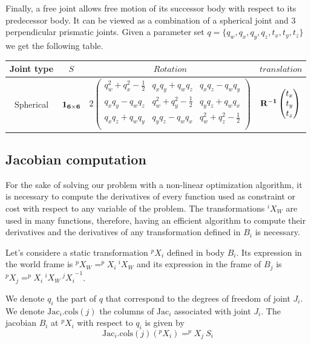 Finally, a free joint allows free motion of its successor body with respect to its predecessor body.
It can be viewed as a combination of a spherical joint and 3 perpendicular prismatic joints.
Given a parameter set $q = \{ q_w, q_x, q_y, q_z, t_x, t_y, t_z\}$ we get the following table.

\begin{tabular}{|c|c|c|c|}
  \hline
  Joint type & $S$ & $Rotation$ & $translation$ \\
  \hline
  Spherical
  &
  $\bf{1}_{6\times 6}$
  &
  $2 \begin{pmatrix}
    q_w^2 +q_x^2-\frac{1}{2} & q_x q_y + q_w q_z & q_x q_z - q_w q_y \\
    q_x q_y - q_w q_z & q_w^2 +q_y^2-\frac{1}{2} & q_y q_z + q_w q_x \\
    q_x q_z + q_w q_y & q_y q_z - q_w q_x & q_w^2 +q_z^2-\frac{1}{2} \\
  \end{pmatrix}$
  &
  $\bf{R}^{-1}\begin{pmatrix}
    t_x \\ t_y \\ t_z
  \end{pmatrix}$
  \\
  \hline
\end{tabular}

\subsection{Jacobian computation}
\label{sub:jacobian_computation}

For the sake of solving our problem with a non-linear optimization algorithm, it is necessary to compute the derivatives of every function used as constraint or cost with respect to any variable of the problem.
The transformations $^iX_W$ are used in many functions, therefore, having an efficient algorithm to compute their derivatives and the derivatives of any transformation defined in $B_i$ is necessary.

Let's considere a static transformation $^pX_i$ defined in body $B_i$.
Its expression in the world frame is $^pX_W = ^pX_i\ ^iX_W$ and its expression in the frame of $B_j$ is $^pX_j = ^pX_i\ ^iX_W\ {^jX_i}^{-1}$.

We denote $q_i$ the part of $q$ that correspond to the degrees of freedom of joint $J_i$.
We denote $\text{Jac}_i.\text{cols}(j)$ the columns of $\text{Jac}_i$ associated with joint $J_i$.
The jacobian $B_i$ at $^pX_i$ with respect to $q_i$ is given by
\begin{equation}
  \label{partial_jacobian}
  \text{Jac}_i.\text{cols}(j)(^pX_i) = ^pX_j\ S_i
\end{equation}

